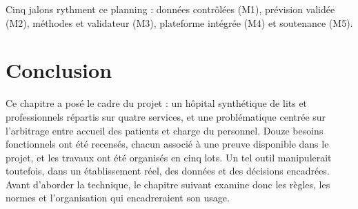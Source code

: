 Cinq jalons rythment ce planning : données contrôlées (M1), prévision validée (M2), méthodes et validateur (M3), plateforme intégrée (M4) et soutenance (M5).

\section*{Conclusion}
Ce chapitre a posé le cadre du projet : un hôpital synthétique de \NbLits{} lits et \NbAgents{} professionnels répartis sur quatre services, et une problématique centrée sur l'arbitrage entre accueil des patients et charge du personnel. Douze besoins fonctionnels ont été recensés, chacun associé à une preuve disponible dans le projet, et les travaux ont été organisés en cinq lots. Un tel outil manipulerait toutefois, dans un établissement réel, des données et des décisions encadrées. Avant d'aborder la technique, le chapitre suivant examine donc les règles, les normes et l'organisation qui encadreraient son usage.
